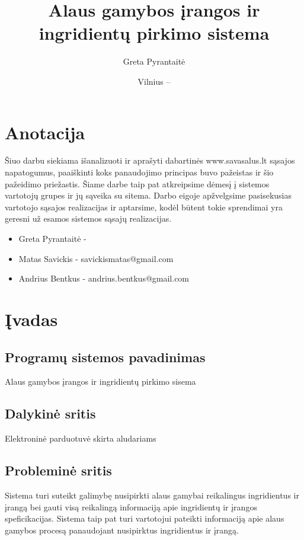 \documentclass[oneside]{VUMIFPSkursinis}
\title{Alaus gamybos įrangos ir ingridientų pirkimo sistema}
\author{Greta Pyrantaitė}
\date{Vilnius – \the\year}
\begin{document}
\maketitle

\section{Anotacija}
Šiuo darbu siekiama išanalizuoti ir aprašyti dabartinės www.savasalus.lt sąsajos napatogumus, paaiškinti koks panaudojimo principas buvo pažeistas ir šio pažeidimo priežastis.
Šiame darbe taip pat atkreipsime dėmesį į sistemos vartotojų grupes ir jų sąveika su sitema.
Darbo eigoje apžvelgsime pasisekusias vartotojo sąsajos realizacijas ir aptarsime, kodėl būtent tokie sprendimai yra geresni už esamos sistemos sąsajų realizacijas.

\begin{itemize}
	\item{Greta Pyrantaitė - }
	\item{Matas Savickis - savickismatas@gmail.com}
	\item{Andrius Bentkus - andrius.bentkus@gmail.com}
\end{itemize}

\tableofcontents

\section{Įvadas}
	\subsection{Programų sistemos pavadinimas}
		Alaus gamybos įrangos ir ingridientų pirkimo sisema
	\subsection{Dalykinė sritis}
		Elektroninė parduotuvė skirta aludariams 
	\subsection{Probleminė sritis}
		Sistema turi suteikt galimybę nusipirkti alaus gamybai reikalingus ingridientus ir įrangą bei gauti visą reikalingą informaciją apie ingridientų ir įrangos speficikacijas. 
		Sistema taip pat turi vartotojui pateikti informaciją apie alaus gamybos procesą panaudojant nusipirktus ingridientus ir įrangą.
\end{document}
